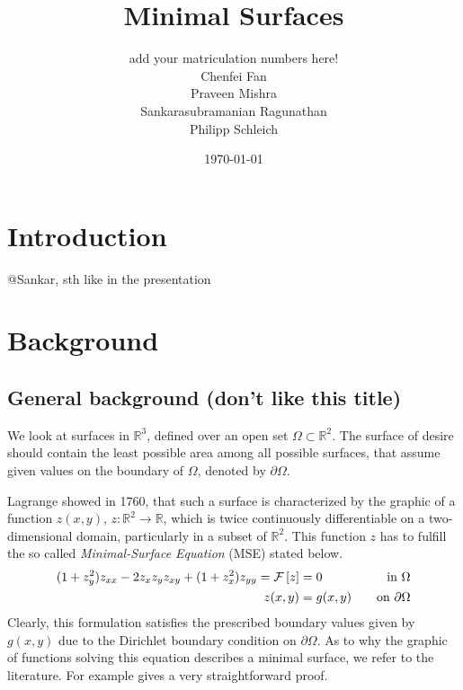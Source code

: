 \documentclass[11pt]{scrartcl}
\title{Minimal Surfaces}
\author{add your matriculation numbers here!\\Chenfei Fan \\  Praveen Mishra \\ Sankarasubramanian Ragunathan\\ Philipp Schleich\quad 391779}
\date{\today \\ \vspace{0.9cm}}
\newcommand{\mSurf}[1]{\ensuremath{\mathcal{F}\left[#1\right]}}
\begin{document}
\maketitle

%
\clearpage
\protect \tableofcontents



\newpage
	
\onehalfspacing
\section{Introduction}
@Sankar, sth like in the presentation
\section{Background}
\subsection{General background (don't like this title)}
We look at surfaces in $ \mathbb{R}^3 $, defined over an open set $\Omega \subset \mathbb{R}^2$. 
The surface of desire should contain the least possible area among all possible surfaces, that assume given values on the boundary of $\Omega$, denoted by $\partial \Omega$. \cite{Sakai1976}

Lagrange showed in 1760, that such a surface is characterized by the graphic of a function $z(x,y)$, $z: \mathbb{R}^2 \to \mathbb{R} $, which is twice continuously differentiable on a two-dimensional domain, particularly in a subset of $\mathbb{R}^2$.
This function $z$ has to fulfill the so called \textit{Minimal-Surface Equation} (MSE) stated below.
\begin{align}\label{eq:MSE}
	(1+z_y^2) z_{xx} - 2 z_x z_y z_{xy} + (1+z_x^2)z_{yy} = \mSurf{z} &= 0 \quad &\text{in } \Omega \\
	z(x,y) &= g(x,y) \quad &\text{on } \partial \Omega \notag
\end{align}
Clearly, this formulation satisfies the prescribed boundary values given by $g(x,y)$ due to the Dirichlet boundary condition on $\partial\Omega$.
As to why the graphic of functions solving this equation describes a minimal surface, we refer to the literature. For example \cite{Sakai1976} gives a very straightforward proof.
\end{document}
